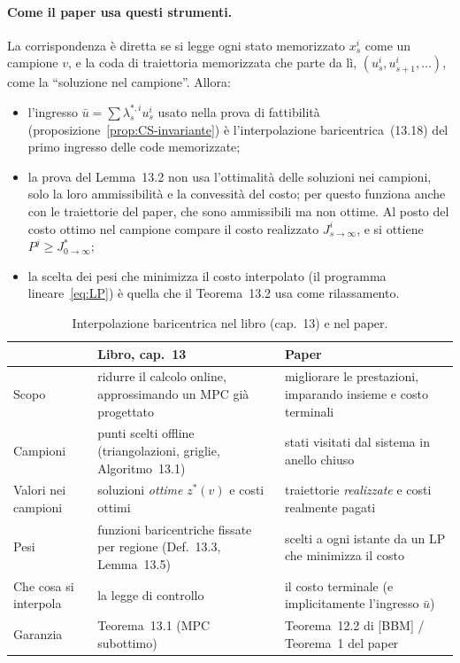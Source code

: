 \documentclass[11pt,a4paper]{article}
\theoremstyle{definition}
\theoremstyle{plain}
\theoremstyle{remark}
\newcommand{\Jstar}{J^{*}_{0\to\infty}}
\begin{document}
\paragraph{Come il paper usa questi strumenti.}
La corrispondenza è diretta se si legge ogni stato memorizzato $x^i_s$ come un
campione $v$, e la coda di traiettoria memorizzata che parte da lì,
$(u^i_s,u^i_{s+1},\dots)$, come la ``soluzione nel campione''. Allora:
\begin{itemize}
  \item l'ingresso $\bar u=\sum\lambda^{*,i}_s u^i_s$ usato nella prova di
        fattibilità (proposizione~\ref{prop:CS-invariante}) è
        l'interpolazione baricentrica~(13.18) del primo ingresso delle code
        memorizzate;
  \item la prova del Lemma~13.2 non usa l'ottimalità delle soluzioni nei
        campioni, solo la loro ammissibilità e la convessità del costo; per
        questo funziona anche con le traiettorie del paper, che sono
        ammissibili ma non ottime. Al posto del costo ottimo nel campione
        compare il costo realizzato $J^i_{s\to\infty}$, e si ottiene
        $P^j\ge\Jstar$;
  \item la scelta dei pesi che minimizza il costo interpolato (il programma
        lineare~\eqref{eq:LP}) è quella che il Teorema~13.2 usa come
        rilassamento.
\end{itemize}

\begin{table}[h]
\centering
\caption{Interpolazione baricentrica nel libro (cap.~13) e nel paper.}\label{tab:baricentrica}
\small
\begin{tabular}{p{2.6cm}p{5.6cm}p{5.9cm}}
\toprule
 & Libro, cap.~13 & Paper \\
\midrule
Scopo & ridurre il calcolo online, approssimando un MPC già progettato
      & migliorare le prestazioni, imparando insieme e costo terminali \\
Campioni & punti scelti offline (triangolazioni, griglie, Algoritmo~13.1)
         & stati visitati dal sistema in anello chiuso \\
Valori nei campioni & soluzioni \emph{ottime} $z^*(v)$ e costi ottimi
                    & traiettorie \emph{realizzate} e costi realmente pagati \\
Pesi & funzioni baricentriche fissate per regione (Def.~13.3, Lemma~13.5)
     & scelti a ogni istante da un LP che minimizza il costo \\
Che cosa si interpola & la legge di controllo
                      & il costo terminale (e implicitamente l'ingresso $\bar u$) \\
Garanzia & Teorema~13.1 (MPC subottimo)
         & Teorema~12.2 di [BBM] / Teorema~1 del paper \\
\bottomrule
\end{tabular}
\end{table}
\end{document}
